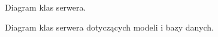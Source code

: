 \documentclass[a4paper,11pt,twoside]{report}
\theoremstyle{definition}
\begin{document}
\begin{figure} 
    \caption{Diagram klas serwera.}
    \label{server-class-1}
\end{figure}

\begin{figure} 
    \caption{Diagram klas serwera dotyczących modeli i bazy danych.}
    \label{server-class-2}
\end{figure}
\end{document}
